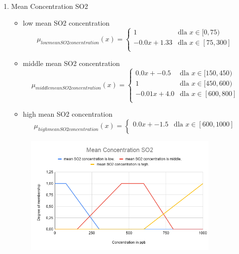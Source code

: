 \documentclass{classrep}
\begin{document}
{{\begin{enumerate}
                \item Mean Concentration SO2
                \begin{itemize}
                    \item low mean SO2 concentration
\begin{displaymath}
\mu_{low mean SO2 concentration}(x) = \left\{ \begin{array}{ll}
1 & \textrm{dla $x \in [0, 75)$}\\
-0.0x + 1.33 & \textrm{dla $x \in [75, 300]$}\\
\end{array} \right.
\end{displaymath}
                    \item middle mean SO2 concentration
\begin{displaymath}
\mu_{middle mean SO2 concentration}(x) = \left\{ \begin{array}{ll}
0.0x + -0.5 & \textrm{dla $x \in [150, 450)$}\\
1 & \textrm{dla $x \in [450, 600)$}\\
-0.01x + 4.0 & \textrm{dla $x \in [600, 800]$}\\
\end{array} \right.
\end{displaymath}
                    \item high mean SO2 concentration
\begin{displaymath}
\mu_{high mean SO2 concentration}(x) = \left\{ \begin{array}{ll}
0.0x + -1.5 & \textrm{dla $x \in [600, 1000]$}\\
\end{array} \right.
\end{displaymath}
                \end{itemize}
                \begin{figure}[!htbp]
                    \centering
                    \includegraphics[width=0.9\textwidth]{img/theory/MeanConcentrationSO2.png}

\end{figure}
\end{enumerate}}}
\end{document}
